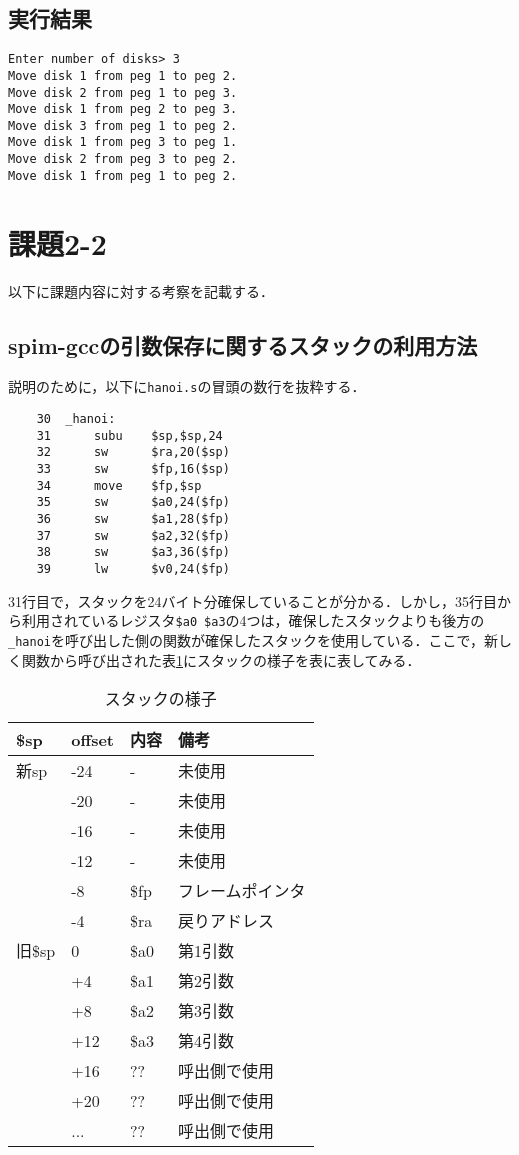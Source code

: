 \documentclass[a4j,11pt]{jarticle}
\begin{document}
\subsection{実行結果}
\begin{verbatim}
Enter number of disks> 3
Move disk 1 from peg 1 to peg 2.
Move disk 2 from peg 1 to peg 3.
Move disk 1 from peg 2 to peg 3.
Move disk 3 from peg 1 to peg 2.
Move disk 1 from peg 3 to peg 1.
Move disk 2 from peg 3 to peg 2.
Move disk 1 from peg 1 to peg 2.
\end{verbatim}
 \section{課題2-2}
以下に課題内容に対する考察を記載する．
  \subsection{spim-gccの引数保存に関するスタックの利用方法}
説明のために，以下に\verb|hanoi.s|の冒頭の数行を抜粋する．
\begin{verbatim}
    30	_hanoi:
    31		subu	$sp,$sp,24
    32		sw	    $ra,20($sp)
    33		sw	    $fp,16($sp)
    34		move	$fp,$sp
    35		sw	    $a0,24($fp)
    36		sw	    $a1,28($fp)
    37		sw	    $a2,32($fp)
    38		sw	    $a3,36($fp)
    39		lw	    $v0,24($fp)
\end{verbatim}
31行目で，スタックを24バイト分確保していることが分かる．しかし，35行目から利用されているレジスタ\verb|$a0|~\verb|$a3|の4つは，確保したスタックよりも後方の\verb|_hanoi|を呼び出した側の関数が確保したスタックを使用している．ここで，新しく関数から呼び出された表\ref{tab:stack}にスタックの様子を表に表してみる．
\begin{table}[t]
\caption{スタックの様子}
\label{tab:stack}
\centering
\begin{tabular}{|l|l|l|l|}
\hline
\$sp  & offset & 内容   & 備考       \\ \hline
新sp   & -24    & -    & 未使用      \\ \hline
      & -20    & -    & 未使用      \\ \hline
      & -16    & -    & 未使用      \\ \hline
      & -12    & -    & 未使用      \\ \hline
      & -8     & \$fp & フレームポインタ \\ \hline
      & -4     & \$ra & 戻りアドレス   \\ \hline
旧\$sp & 0      & \$a0 & 第1引数     \\ \hline
      & +4     & \$a1 & 第2引数     \\ \hline
      & +8     & \$a2 & 第3引数     \\ \hline
      & +12    & \$a3 & 第4引数     \\ \hline
      & +16    & ??   & 呼出側で使用   \\ \hline
      & +20    & ??   & 呼出側で使用   \\ \hline
      & ...    & ??   & 呼出側で使用   \\ \hline
\end{tabular}
\end{table}
\end{document}
